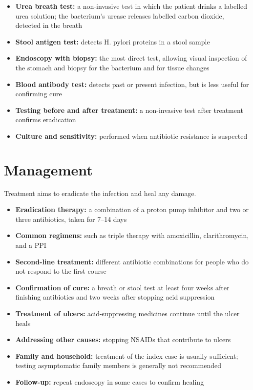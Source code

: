\begin{itemize}
    \item \textbf{Urea breath test:} a non-invasive test in which the patient drinks a labelled urea solution; the bacterium's urease releases labelled carbon dioxide, detected in the breath
    \item \textbf{Stool antigen test:} detects H. pylori proteins in a stool sample
    \item \textbf{Endoscopy with biopsy:} the most direct test, allowing visual inspection of the stomach and biopsy for the bacterium and for tissue changes
    \item \textbf{Blood antibody test:} detects past or present infection, but is less useful for confirming cure
    \item \textbf{Testing before and after treatment:} a non-invasive test after treatment confirms eradication
    \item \textbf{Culture and sensitivity:} performed when antibiotic resistance is suspected
\end{itemize}

\section*{Management}
Treatment aims to eradicate the infection and heal any damage.

\begin{itemize}
    \item \textbf{Eradication therapy:} a combination of a proton pump inhibitor and two or three antibiotics, taken for 7--14 days
    \item \textbf{Common regimens:} such as triple therapy with amoxicillin, clarithromycin, and a PPI
    \item \textbf{Second-line treatment:} different antibiotic combinations for people who do not respond to the first course
    \item \textbf{Confirmation of cure:} a breath or stool test at least four weeks after finishing antibiotics and two weeks after stopping acid suppression
    \item \textbf{Treatment of ulcers:} acid-suppressing medicines continue until the ulcer heals
    \item \textbf{Addressing other causes:} stopping NSAIDs that contribute to ulcers
    \item \textbf{Family and household:} treatment of the index case is usually sufficient; testing asymptomatic family members is generally not recommended
    \item \textbf{Follow-up:} repeat endoscopy in some cases to confirm healing
\end{itemize}

